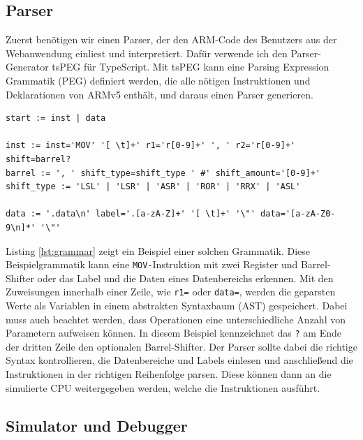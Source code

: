 \documentclass[a4paper, 11pt, onecolumn]{article}
\begin{document}
\subsection{Parser}

Zuerst benötigen wir einen Parser, der den ARM-Code des Benutzers aus der Webanwendung einliest und interpretiert. Dafür verwende ich den Parser-Generator tsPEG \cite{tspeg} für TypeScript. Mit tsPEG kann eine Parsing Expression Grammatik (PEG) \cite{peg} definiert werden, die alle nötigen Instruktionen und Deklarationen von ARMv5 enthält, und daraus einen Parser generieren.

\begin{lstlisting}[caption={Beispielgrammatik mit tsPEG für die \texttt{MOV-}Instruktion mit 2 Registern und Barrel-Shifter oder Daten eines Speicherbereichs mit Label.},label={lst:grammar}]
start := inst | data

inst := inst='MOV' '[ \t]+' r1='r[0-9]+' ', ' r2='r[0-9]+' shift=barrel?
barrel := ', ' shift_type=shift_type ' #' shift_amount='[0-9]+'
shift_type := 'LSL' | 'LSR' | 'ASR' | 'ROR' | 'RRX' | 'ASL'

data := '.data\n' label='.[a-zA-Z]+' '[ \t]+' '\"' data='[a-zA-Z0-9\n]*' '\"'
\end{lstlisting}

Listing \ref{lst:grammar} zeigt ein Beispiel einer solchen Grammatik. Diese Beispielgrammatik kann eine \texttt{MOV-}Instruktion mit zwei Register und Barrel-Shifter oder das Label und die Daten eines Datenbereichs erkennen. Mit den Zuweisungen innerhalb einer Zeile, wie \texttt{r1=} oder \texttt{data=}, werden die geparsten Werte als Variablen in einem abstrakten Syntaxbaum (AST) gespeichert. Dabei muss auch beachtet werden, dass Operationen eine unterschiedliche Anzahl von Parametern aufweisen können. In diesem Beispiel kennzeichnet das \texttt{?} am Ende der dritten Zeile den optionalen Barrel-Shifter. Der Parser sollte dabei die richtige Syntax kontrollieren, die Datenbereiche und Labels einlesen und anschließend die Instruktionen in der richtigen Reihenfolge parsen. Diese können dann an die simulierte CPU weitergegeben werden, welche die Instruktionen ausführt.

\subsection{Simulator und Debugger}\label{sec:debug}
\end{document}
